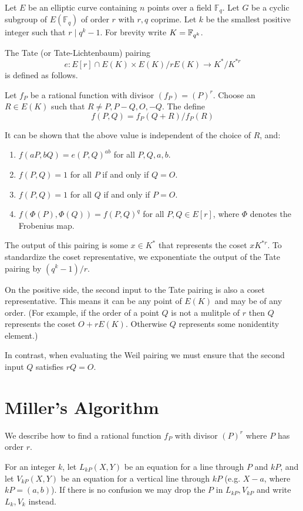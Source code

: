 Let $E$ be an elliptic curve containing $n$ points over a field $\mathbb{F}_q$.
Let $G$ be a cyclic subgroup of $E(\mathbb{F}_q)$ of order $r$ with $r, q$
coprime. Let $k$ be the smallest positive integer such that $r \mid q^k - 1$.
For brevity write $K = \mathbb{F}_{q^k}$.

The Tate (or Tate-Lichtenbaum) pairing
\[
e : E[r] \cap E(K) \times
E(K) / r E(K) \rightarrow
K^* / K^{*r}
\]
is defined as follows.

Let $f_P$ be a rational function with divisor $(f_P) = (P)^r$.
Choose an $R\in E(K)$ such that $R \ne P, P-Q, O, -Q$. The define
\[
f(P, Q) = f_P (Q + R) / f_P (R)
\]

It can be shown that the above value is independent of the choice of $R$,
and:
\begin{enumerate}
\item
$f(a P, b Q) = e(P, Q)^{a b}$ for all $P, Q, a, b$.
\item
$f(P,Q) = 1$ for all $P$ if and only if $Q = O$.
\item
$f(P,Q) = 1$ for all $Q$ if and only if $P = O$.
\item
$f(\Phi(P),\Phi(Q)) = f(P,Q)^{q}$ for all $P,Q \in E[r]$,
where $\Phi$ denotes the Frobenius map.
\end{enumerate}

The output of this pairing is some $x \in K^*$
that represents the coset $x K^{*r}$. To standardize the coset
representative, we exponentiate the output of the Tate pairing
by $(q^k - 1) / r$.

On the positive side, the second input to the Tate pairing is also a coset
representative. This means it can be any point of $E(K)$ and may
be of any order. (For example,
if the order of a point $Q$ is not a mulitple of $r$ then $Q$ represents
the coset $O + r E(K)$. Otherwise $Q$ represents some nonidentity
element.)

In contrast, when evaluating the Weil pairing we must ensure that the second
input $Q$ satisfies $r Q = O$.

\section {Miller's Algorithm}

We describe how to find a rational function $f_P$ with divisor
$(P)^r$ \cite{miller} where $P$ has order $r$.

For an integer $k$,
let $L_{kP}(X,Y)$ be an equation for a line through $P$ and $kP$,
and let
$V_{kP}(X,Y)$ be an equation for a vertical line through $kP$ (e.g.
$X - a$, where $kP = (a, b)$).
If there is no confusion we may drop the $P$ in $L_{kP}, V_{kP}$ and write
$L_k, V_k$ instead.

